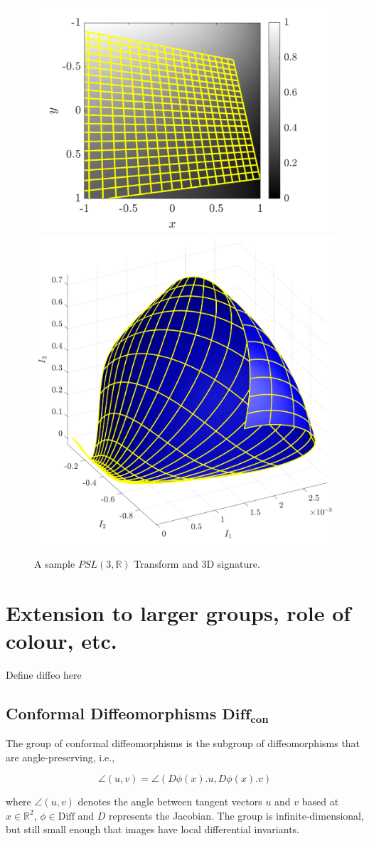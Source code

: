 \documentclass[review,onefignum,onetabnum]{siamonline190516}
\begin{document}
{\begin{figure}
\centering
\includegraphics[width=.45\textwidth]{Figs/f_transformed_PSL3R.png}
\includegraphics[width=.45\textwidth]{Figs/PSL3R_signature.png}
\caption{A sample $PSL(3,\mathbb{R})$ Transform and 3D signature.}
\label{fig:PSL3R}
\end{figure}

\section{Extension to larger groups, role of colour, etc.}
\label{sec:aaah}

Define diffeo here

\subsection{Conformal Diffeomorphisms $\mathbf{Diff}_{\mathbf{con}}$}


The group of conformal diffeomorphisms is the subgroup of diffeomorphisms that are angle-preserving, i.e.,

\begin{equation}
\angle (u,v) = \angle (D \phi(x) . u, D \phi(x).v)
\end{equation}

\noindent where $\angle(u, v)$ denotes the angle between tangent vectors
$u$ and $v$ based at $x \in \mathbb{R}^2$, $\phi \in \textrm{Diff}$ and $D$
represents the Jacobian. The group is infinite-dimensional, but still small
enough that images have local differential invariants.

}
\end{document}

